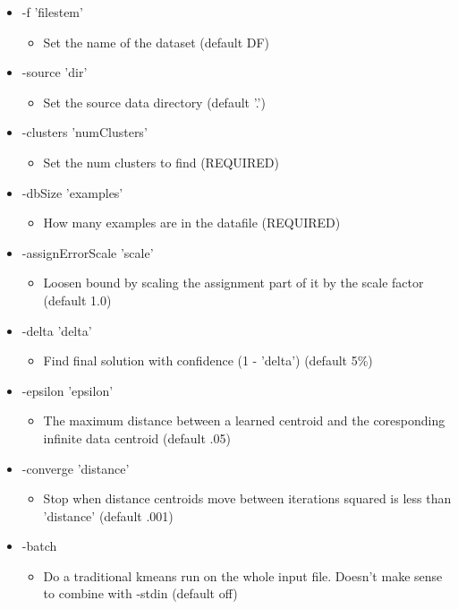 \begin{itemize}
\item -f 'filestem'\begin{itemize}
\item Set the name of the dataset (default DF)\end{itemize}
\item -source 'dir'\begin{itemize}
\item Set the source data directory (default '.')\end{itemize}
\item -clusters 'num\-Clusters'\begin{itemize}
\item Set the num clusters to find (REQUIRED)\end{itemize}
\item -db\-Size 'examples'\begin{itemize}
\item How many examples are in the datafile (REQUIRED)\end{itemize}
\item -assign\-Error\-Scale 'scale'\begin{itemize}
\item Loosen bound by scaling the assignment part of it by the scale factor (default 1.0)\end{itemize}
\item -delta 'delta'\begin{itemize}
\item Find final solution with confidence (1 - 'delta') (default 5\%)\end{itemize}
\item -epsilon 'epsilon'\begin{itemize}
\item The maximum distance between a learned centroid and the coresponding infinite data centroid (default .05)\end{itemize}
\item -converge 'distance'\begin{itemize}
\item Stop when distance centroids move between iterations squared is less than 'distance' (default .001)\end{itemize}
\item -batch\begin{itemize}
\item Do a traditional kmeans run on the whole input file. Doesn't make sense to combine with -stdin (default off)\end{itemize}

\end{itemize}
